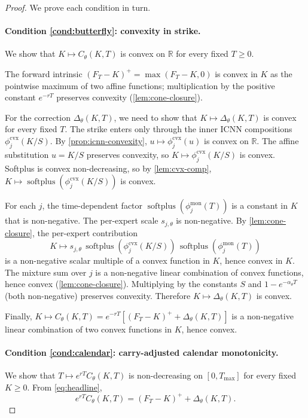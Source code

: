 \documentclass[largeformat]{interact}
\theoremstyle{plain}
\theoremstyle{definition}
\newcommand{\R}{\mathbb{R}}
\DeclareMathOperator{\softplus}{softplus}
\begin{document}
\begin{proof}
We prove each condition in turn.

\paragraph{Condition \ref{cond:butterfly}: convexity in strike.}
We show that $K \mapsto C_\theta(K, T)$ is convex on $\R$ for every fixed $T \geq 0$.

The forward intrinsic $(F_T - K)^+ = \max(F_T - K, 0)$ is convex in $K$ as the pointwise maximum of two affine functions; multiplication by the positive constant $e^{-rT}$ preserves convexity (\cref{lem:cone-closure}).

For the correction $\Delta_\theta(K, T)$, we need to show that $K \mapsto \Delta_\theta(K, T)$ is convex for every fixed $T$. The strike enters only through the inner ICNN compositions $\phi^{\mathrm{cvx}}_j(K/S)$. By \cref{prop:icnn-convexity}, $u \mapsto \phi^{\mathrm{cvx}}_j(u)$ is convex on $\R$. The affine substitution $u = K/S$ preserves convexity, so $K \mapsto \phi^{\mathrm{cvx}}_j(K/S)$ is convex. Softplus is convex non-decreasing, so by \cref{lem:cvx-comp}, $K \mapsto \softplus(\phi^{\mathrm{cvx}}_j(K/S))$ is convex.

For each $j$, the time-dependent factor $\softplus(\phi^{\mathrm{mon}}_j(T))$ is a constant in $K$ that is non-negative. The per-expert scale $s_{j,\theta}$ is non-negative. By \cref{lem:cone-closure}, the per-expert contribution
\[
K \mapsto s_{j,\theta}\,\softplus(\phi^{\mathrm{cvx}}_j(K/S))\,\softplus(\phi^{\mathrm{mon}}_j(T))
\]
is a non-negative scalar multiple of a convex function in $K$, hence convex in $K$. The mixture sum over $j$ is a non-negative linear combination of convex functions, hence convex (\cref{lem:cone-closure}). Multiplying by the constants $S$ and $1 - e^{-\alpha_\theta T}$ (both non-negative) preserves convexity. Therefore $K \mapsto \Delta_\theta(K, T)$ is convex.

Finally, $K \mapsto C_\theta(K, T) = e^{-rT}[(F_T - K)^+ + \Delta_\theta(K, T)]$ is a non-negative linear combination of two convex functions in $K$, hence convex.

\paragraph{Condition \ref{cond:calendar}: carry-adjusted calendar monotonicity.}
We show that $T \mapsto e^{rT} C_\theta(K, T)$ is non-decreasing on $[0, T_{\max}]$ for every fixed $K \geq 0$. From \cref{eq:headline},
\[
e^{rT} C_\theta(K, T) = (F_T - K)^+ + \Delta_\theta(K, T).
\]


\end{proof}
\end{document}
